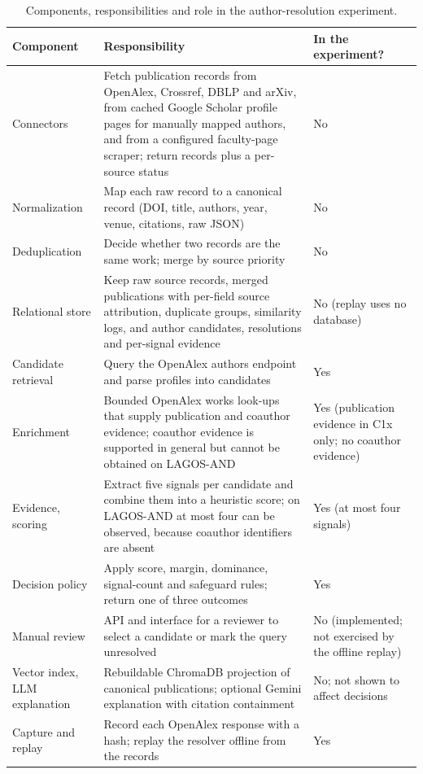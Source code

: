 \begin{table}[t]
\caption{Components, responsibilities and role in the author-resolution experiment.}
\label{tab:components}
\centering
\footnotesize
\renewcommand{\arraystretch}{1.12}
\begin{tabular}{@{}p{}p{}p{}@{}}
\toprule
\textbf{Component} & \textbf{Responsibility} & \textbf{In the experiment?} \\
\midrule
Connectors & Fetch publication records from OpenAlex, Crossref, DBLP and arXiv, from cached Google Scholar profile pages for manually mapped authors, and from a configured faculty-page scraper; return records plus a per-source status & No \\
Normalization & Map each raw record to a canonical record (DOI, title, authors, year, venue, citations, raw JSON) & No \\
Deduplication & Decide whether two records are the same work; merge by source priority & No \\
Relational store & Keep raw source records, merged publications with per-field source attribution, duplicate groups, similarity logs, and author candidates, resolutions and per-signal evidence & No (replay uses no database) \\
Candidate retrieval & Query the OpenAlex authors endpoint and parse profiles into candidates & Yes \\
Enrichment & Bounded OpenAlex works look-ups that supply publication and coauthor evidence; coauthor evidence is supported in general but cannot be obtained on LAGOS-AND & Yes (publication evidence in C1x only; no coauthor evidence) \\
Evidence, scoring & Extract five signals per candidate and combine them into a heuristic score; on LAGOS-AND at most four can be observed, because coauthor identifiers are absent & Yes (at most four signals) \\
Decision policy & Apply score, margin, dominance, signal-count and safeguard rules; return one of three outcomes & Yes \\
Manual review & API and interface for a reviewer to select a candidate or mark the query unresolved & No (implemented; not exercised by the offline replay) \\
Vector index, LLM explanation & Rebuildable ChromaDB projection of canonical publications; optional Gemini explanation with citation containment & No; not shown to affect decisions \\
Capture and replay & Record each OpenAlex response with a hash; replay the resolver offline from the records & Yes \\
\bottomrule
\end{tabular}
\end{table}

